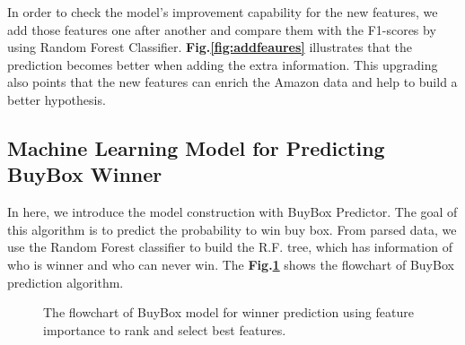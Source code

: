 %

In order to check the model's improvement capability for the new features, we add those features one after another and compare them with the F1-scores by using Random Forest Classifier. \textbf{Fig.\ref{fig:addfeaures}} illustrates that the prediction becomes better when adding the extra information. This upgrading also points that the new features can enrich the Amazon data and help to build a better hypothesis.


\subsection{Machine Learning Model for Predicting BuyBox Winner}
\label{sec:buyboxmodel}

In here, we introduce the model construction with BuyBox Predictor. The goal of this algorithm is to predict the probability to win buy box. From parsed data, we use the Random Forest classifier to build the R.F. tree, which has information of who is winner and who can never win. The \textbf{Fig.\ref{fig:buyboxflow}} shows the flowchart of BuyBox prediction algorithm.

\begin{figure}[!h]
	\begin{center}
	\end{center}
	\caption{\label{fig:buyboxflow}The flowchart of BuyBox model for winner prediction using feature importance to rank and select best features.}
\end{figure}

